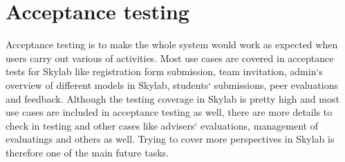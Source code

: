 \section{Acceptance testing} \label{acceptancetesting}

Acceptance testing is to make the whole system would work as expected when users carry out various of activities. Most use cases are covered in acceptance tests for Skylab like registration form submission, team invitation, admin`s overview of different models in Skylab, students` submissions, peer evaluations and feedback. Although the testing coverage in Skylab is pretty high and most use cases are included in acceptance testing as well, there are more details to check in testing and other cases like advisers` evaluations, management of evaluatings and others as well. Trying to cover more perspectives in Skylab is therefore one of the main future tasks.

